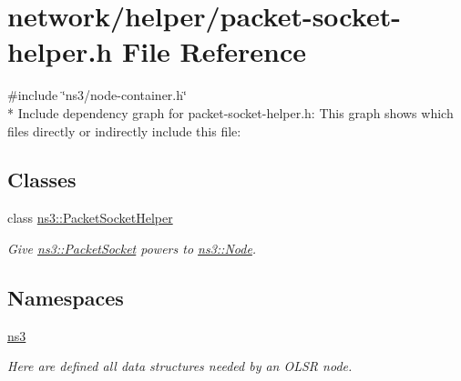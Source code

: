 \hypertarget{packet-socket-helper_8h}{}\section{network/helper/packet-\/socket-\/helper.h File Reference}
\label{packet-socket-helper_8h}
{\ttfamily \#include \char`\"{}ns3/node-\/container.\+h\char`\"{}}\\*
Include dependency graph for packet-\/socket-\/helper.h\+:
This graph shows which files directly or indirectly include this file\+:
\subsection*{Classes}
\begin{DoxyCompactItemize}
\item 
class \hyperlink{classns3_1_1PacketSocketHelper}{ns3\+::\+Packet\+Socket\+Helper}
\begin{DoxyCompactList}\small\item\em Give \hyperlink{classns3_1_1PacketSocket}{ns3\+::\+Packet\+Socket} powers to \hyperlink{classns3_1_1Node}{ns3\+::\+Node}. \end{DoxyCompactList}\end{DoxyCompactItemize}
\subsection*{Namespaces}
\begin{DoxyCompactItemize}
\item 
 \hyperlink{namespacens3}{ns3}
\begin{DoxyCompactList}\small\item\em Here are defined all data structures needed by an O\+L\+SR node. \end{DoxyCompactList}\end{DoxyCompactItemize}
